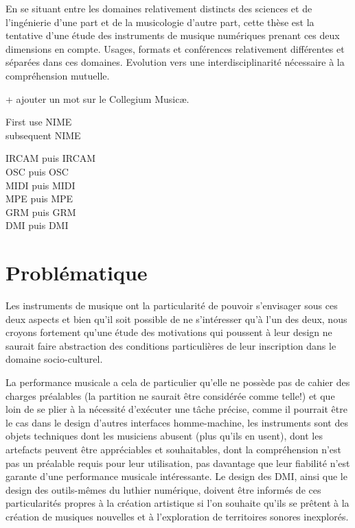 En se situant entre les domaines relativement distincts des sciences et de l'ingénierie d'une part et de la musicologie d'autre part, cette thèse est la tentative d'une étude des instruments de musique numériques prenant ces deux dimensions en compte.
Usages, formats et conférences relativement différentes et séparées dans ces domaines. 
Evolution vers une interdisciplinarité nécessaire à la compréhension mutuelle.

+ ajouter un mot sur le Collegium Musicæ.

First use \gls{NIME}\\
subsequent \gls{NIME}

\gls{IRCAM} puis \gls{IRCAM}\\
\gls{OSC} puis \gls{OSC}\\
\gls{MIDI} puis \gls{MIDI}\\
\gls{MPE} puis \gls{MPE}\\
\gls{GRM} puis \gls{GRM}\\
\gls{DMI} puis \gls{DMI}\\



\section{Problématique}

Les instruments de musique ont la particularité de pouvoir s'envisager sous ces deux aspects et bien qu'il soit possible de ne s'intéresser qu'à l'un des deux, nous croyons fortement qu'une étude des motivations qui poussent à leur design ne saurait faire abstraction des conditions particulières de leur inscription dans le domaine socio-culturel.

La performance musicale a cela de particulier qu'elle ne possède pas de cahier des charges préalables (la partition ne saurait être considérée comme telle!) et que loin de se plier à la nécessité d'exécuter une tâche précise, comme il pourrait être le cas dans le design d'autres interfaces homme-machine, les instruments sont des objets techniques dont les musiciens abusent (plus qu'ils en usent), dont les artefacts peuvent être appréciables et souhaitables, dont la compréhension n'est pas un préalable requis pour leur utilisation, pas davantage que leur fiabilité n'est garante d'une performance musicale intéressante.
%
Le design des DMI, ainsi que le design des outils-mêmes du luthier numérique, doivent être informés de ces particularités propres à la création artistique si l'on souhaite qu'ils se prêtent à la création de musiques nouvelles et à l'exploration de territoires sonores inexplorés.

